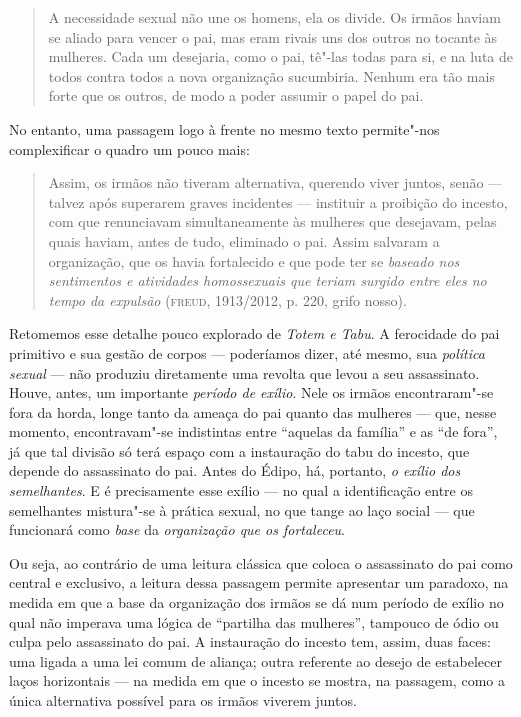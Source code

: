 \begin{quote}
A necessidade sexual não une os homens, ela os divide. Os irmãos haviam
se aliado para vencer o pai, mas eram rivais uns dos outros no tocante
às mulheres. Cada um desejaria, como o pai, tê"-las todas para si, e na
luta de todos contra todos a nova organização sucumbiria. Nenhum era tão
mais forte que os outros, de modo a poder assumir o papel do pai.
\end{quote}

No entanto, uma passagem logo à frente no mesmo texto permite"-nos
complexificar o quadro um pouco mais:

\begin{quote}
Assim, os irmãos não tiveram alternativa, querendo viver juntos, senão
--- talvez após superarem graves incidentes --- instituir a proibição do
incesto, com que renunciavam simultaneamente às mulheres que desejavam,
pelas quais haviam, antes de tudo, eliminado o pai. Assim salvaram a
organização, que os havia fortalecido e que pode ter se \emph{baseado
nos sentimentos e atividades homossexuais que teriam surgido entre eles
no tempo da expulsão} (\textsc{freud}, 1913/2012, p. 220, grifo nosso).
\end{quote}

Retomemos esse detalhe pouco explorado de \emph{Totem e Tabu}. A ferocidade
do pai primitivo e sua gestão de corpos --- poderíamos dizer, até mesmo,
sua \emph{política sexual} --- não produziu diretamente uma revolta que
levou a seu assassinato. Houve, antes, um importante \emph{período de
exílio}. Nele os irmãos encontraram"-se fora da horda, longe tanto da
ameaça do pai quanto das mulheres --- que, nesse momento, encontravam"-se
indistintas entre ``aquelas da família'' e as ``de fora'', já que tal
divisão só terá espaço com a instauração do tabu do incesto, que depende
do assassinato do pai. Antes do Édipo, há, portanto, \emph{o exílio dos
semelhantes}. E é precisamente esse exílio --- no qual a identificação
entre os semelhantes mistura"-se à prática sexual, no que tange ao laço
social --- que funcionará como \emph{base} da \emph{organização que os
fortaleceu}.

Ou seja, ao contrário de uma leitura clássica que coloca o assassinato
do pai como central e exclusivo, a leitura dessa passagem permite
apresentar um paradoxo, na medida em que a base da organização dos
irmãos se dá num período de exílio no qual não imperava uma lógica de
``partilha das mulheres'', tampouco de ódio ou culpa pelo assassinato do
pai. A instauração do incesto tem, assim, duas faces: uma ligada a uma
lei comum de aliança; outra referente ao desejo de estabelecer laços
horizontais --- na medida em que o incesto se mostra, na passagem, como
a única alternativa possível para os irmãos viverem juntos.

